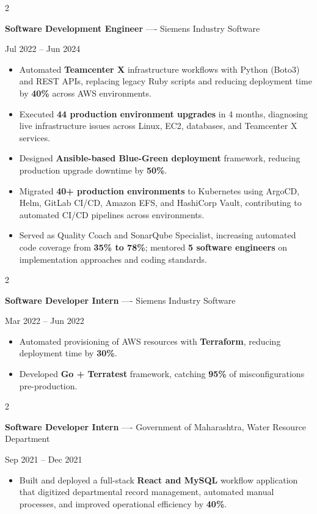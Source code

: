 \documentclass[10pt, letterpaper]{article}
\newenvironment{highlights}{
    \begin{itemize}[
        topsep=0.10 cm,
        parsep=0.06 cm,
        partopsep=0pt,
        itemsep=0.06 cm,
        leftmargin=12pt
    ]
}{
    \end{itemize}
}
\newenvironment{twocolentry}[2][]{
    \onecolentry
    \def\secondColumn{#2}
    \setcolumnwidth{\fill, 4.5 cm}
    \begin{paracol}{2}
}{
    \switchcolumn \raggedleft \secondColumn
    \end{paracol}
    \endonecolentry
}
\begin{document}
\vspace{0.15 cm}

\begin{twocolentry}{Jul 2022 -- Jun 2024}
\textbf{Software Development Engineer} ---- Siemens Industry Software
\end{twocolentry}
\begin{highlights}
  \item Automated \textbf{Teamcenter X} infrastructure workflows with Python (Boto3) and REST APIs, replacing legacy Ruby scripts and reducing deployment time by \textbf{40\%} across AWS environments.
  \item Executed \textbf{44 production environment upgrades} in 4 months, diagnosing live infrastructure issues across Linux, EC2, databases, and Teamcenter X services.
  \item Designed \textbf{Ansible-based Blue-Green deployment} framework, reducing production upgrade downtime by \textbf{50\%}.
  \item Migrated \textbf{40+ production environments} to Kubernetes using ArgoCD, Helm, GitLab CI/CD, Amazon EFS, and HashiCorp Vault, contributing to automated CI/CD pipelines across environments.
  \item Served as Quality Coach and SonarQube Specialist, increasing automated code coverage from \textbf{35\% to 78\%}; mentored \textbf{5 software engineers} on implementation approaches and coding standards.
\end{highlights}

\vspace{0.15 cm}

\begin{twocolentry}{Mar 2022 -- Jun 2022}
\textbf{Software Developer Intern} ---- Siemens Industry Software
\end{twocolentry}
\begin{highlights}
  \item Automated provisioning of AWS resources with \textbf{Terraform}, reducing deployment time by \textbf{30\%}.
  \item Developed \textbf{Go + Terratest} framework, catching \textbf{95\%} of misconfigurations pre-production.
\end{highlights}

\vspace{0.15 cm}

\begin{twocolentry}{Sep 2021 -- Dec 2021}
\textbf{Software Developer Intern} ---- Government of Maharashtra, Water Resource Department
\end{twocolentry}
\begin{highlights}
  \item Built and deployed a full-stack \textbf{React and MySQL} workflow application that digitized departmental record management, automated manual processes, and improved operational efficiency by \textbf{40\%}.
\end{highlights}
\end{document}
